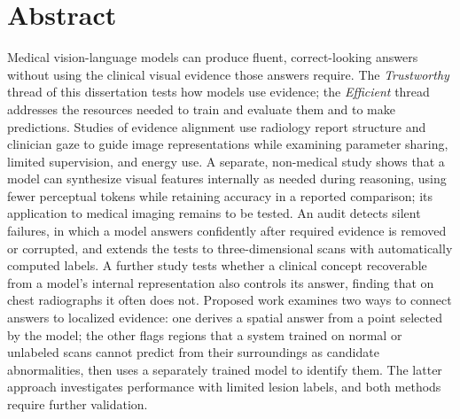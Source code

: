 \section*{Abstract}
Medical vision-language models can produce fluent, correct-looking answers without using the clinical visual evidence those answers require. The \emph{Trustworthy} thread of this dissertation tests how models use evidence; the \emph{Efficient} thread addresses the resources needed to train and evaluate them and to make predictions. Studies of evidence alignment use radiology report structure and clinician gaze to guide image representations while examining parameter sharing, limited supervision, and energy use. A separate, non-medical study shows that a model can synthesize visual features internally as needed during reasoning, using fewer perceptual tokens while retaining accuracy in a reported comparison; its application to medical imaging remains to be tested. An audit detects silent failures, in which a model answers confidently after required evidence is removed or corrupted, and extends the tests to three-dimensional scans with automatically computed labels. A further study tests whether a clinical concept recoverable from a model's internal representation also controls its answer, finding that on chest radiographs it often does not. Proposed work examines two ways to connect answers to localized evidence: one derives a spatial answer from a point selected by the model; the other flags regions that a system trained on normal or unlabeled scans cannot predict from their surroundings as candidate abnormalities, then uses a separately trained model to identify them. The latter approach investigates performance with limited lesion labels, and both methods require further validation.
